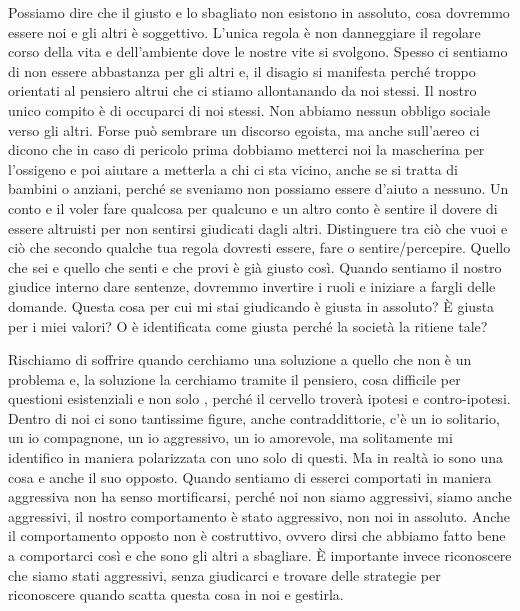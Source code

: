 \documentclass[12pt]{book} %
\begin{document}
Possiamo dire che il giusto e lo sbagliato non esistono in assoluto, cosa dovremmo essere noi e gli altri è soggettivo. L'unica regola è non danneggiare il regolare corso della vita e
dell'ambiente dove le nostre vite si svolgono. Spesso ci sentiamo di non essere abbastanza per gli
altri e, il disagio si manifesta perché troppo orientati al pensiero altrui che ci stiamo allontanando da noi stessi.
Il nostro unico compito è di occuparci di noi stessi. Non abbiamo nessun obbligo sociale verso gli altri. Forse può sembrare un
discorso egoista, ma anche sull'aereo ci dicono che in caso di pericolo prima dobbiamo
metterci noi la mascherina per l'ossigeno e poi aiutare a metterla a chi ci sta vicino, anche se
si tratta di bambini o anziani, perché se sveniamo non possiamo essere d'aiuto a nessuno. 
Un conto e il voler fare qualcosa per qualcuno e un altro conto è sentire il
dovere di essere altruisti per non sentirsi giudicati dagli altri. Distinguere tra ciò
che vuoi e ciò che secondo qualche tua regola dovresti essere, fare o sentire/percepire. Quello che sei e quello che
senti e che provi è già giusto così. 
Quando sentiamo il nostro giudice interno dare sentenze, dovremmo invertire i ruoli e iniziare a fargli delle domande. Questa
cosa per cui mi stai giudicando è giusta in assoluto? È giusta per i miei valori? O è identificata come giusta perché
la società la ritiene tale?

Rischiamo di soffrire quando cerchiamo una soluzione a quello che non è un problema e, la soluzione la cerchiamo tramite il
pensiero, cosa difficile per questioni esistenziali e non solo , perché il cervello troverà ipotesi e contro-ipotesi. Dentro
di noi ci sono tantissime figure, anche contraddittorie, c'è un io solitario, un io compagnone, un io aggressivo, un io
amorevole, ma solitamente mi identifico in maniera polarizzata con uno solo di questi. Ma in realtà io sono una cosa e
anche il suo opposto. Quando sentiamo di esserci comportati in maniera aggressiva non ha senso mortificarsi, perché noi
non siamo aggressivi, siamo anche aggressivi, il nostro comportamento è stato aggressivo, non noi in assoluto. Anche il
comportamento opposto non è costruttivo, ovvero dirsi che abbiamo fatto bene a comportarci così e che sono gli altri a
sbagliare. È importante invece riconoscere che siamo stati aggressivi, senza giudicarci e trovare delle strategie per
riconoscere quando scatta questa cosa in noi e gestirla. 
\end{document}
